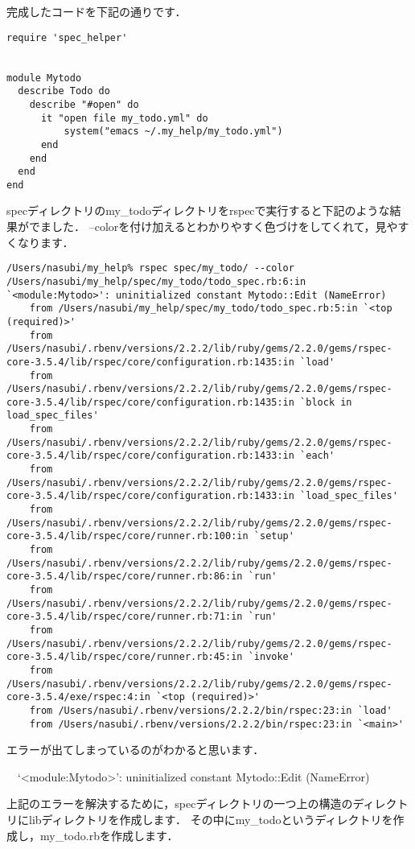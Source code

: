 完成したコードを下記の通りです．
\begin{lstlisting}[style=customRuby]
require 'spec_helper'


module Mytodo
  describe Todo do
    describe "#open" do
      it "open file my_todo.yml" do
          system("emacs ~/.my_help/my_todo.yml")
      end
    end
  end
end

\end{lstlisting}
specディレクトリのmy\_todoディレクトリをrspecで実行すると下記のような結果がでました．
--colorを付け加えるとわかりやすく色づけをしてくれて，見やすくなります．
\begin{lstlisting}[style=customCsh]
/Users/nasubi/my_help% rspec spec/my_todo/ --color
/Users/nasubi/my_help/spec/my_todo/todo_spec.rb:6:in `<module:Mytodo>': uninitialized constant Mytodo::Edit (NameError)
	from /Users/nasubi/my_help/spec/my_todo/todo_spec.rb:5:in `<top (required)>'
	from /Users/nasubi/.rbenv/versions/2.2.2/lib/ruby/gems/2.2.0/gems/rspec-core-3.5.4/lib/rspec/core/configuration.rb:1435:in `load'
	from /Users/nasubi/.rbenv/versions/2.2.2/lib/ruby/gems/2.2.0/gems/rspec-core-3.5.4/lib/rspec/core/configuration.rb:1435:in `block in load_spec_files'
	from /Users/nasubi/.rbenv/versions/2.2.2/lib/ruby/gems/2.2.0/gems/rspec-core-3.5.4/lib/rspec/core/configuration.rb:1433:in `each'
	from /Users/nasubi/.rbenv/versions/2.2.2/lib/ruby/gems/2.2.0/gems/rspec-core-3.5.4/lib/rspec/core/configuration.rb:1433:in `load_spec_files'
	from /Users/nasubi/.rbenv/versions/2.2.2/lib/ruby/gems/2.2.0/gems/rspec-core-3.5.4/lib/rspec/core/runner.rb:100:in `setup'
	from /Users/nasubi/.rbenv/versions/2.2.2/lib/ruby/gems/2.2.0/gems/rspec-core-3.5.4/lib/rspec/core/runner.rb:86:in `run'
	from /Users/nasubi/.rbenv/versions/2.2.2/lib/ruby/gems/2.2.0/gems/rspec-core-3.5.4/lib/rspec/core/runner.rb:71:in `run'
	from /Users/nasubi/.rbenv/versions/2.2.2/lib/ruby/gems/2.2.0/gems/rspec-core-3.5.4/lib/rspec/core/runner.rb:45:in `invoke'
	from /Users/nasubi/.rbenv/versions/2.2.2/lib/ruby/gems/2.2.0/gems/rspec-core-3.5.4/exe/rspec:4:in `<top (required)>'
	from /Users/nasubi/.rbenv/versions/2.2.2/bin/rspec:23:in `load'
	from /Users/nasubi/.rbenv/versions/2.2.2/bin/rspec:23:in `<main>'

\end{lstlisting}
エラーが出てしまっているのがわかると思います．

　`<module:Mytodo>': uninitialized constant Mytodo::Edit (NameError)

上記のエラーを解決するために，specディレクトリの一つ上の構造のディレクトリにlibディレクトリを作成します．
その中にmy\_todoというディレクトリを作成し，my\_todo.rbを作成します．

